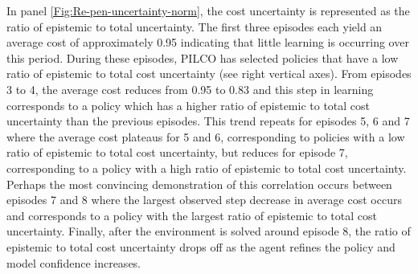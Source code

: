 In panel \ref{Fig:Re-pen-uncertainty-norm}, the cost uncertainty is represented as the ratio of epistemic to total uncertainty. The first three episodes each yield an average cost of approximately 0.95 indicating that little learning is occurring over this period. During these episodes, PILCO has selected policies that have a low ratio of epistemic to total cost uncertainty (see right vertical axes). From episodes 3 to 4, the average cost reduces from 0.95 to 0.83 and this step in learning corresponds to a policy which has a higher ratio of epistemic to total cost uncertainty than the previous episodes. This trend repeats for episodes 5, 6 and 7 where the average cost plateaus for 5 and 6, corresponding to policies with a low ratio of epistemic to total cost uncertainty, but reduces for episode 7, corresponding to a policy with a high ratio of epistemic to total cost uncertainty. Perhaps the most convincing demonstration of this correlation occurs between episodes 7 and 8 where the largest observed step decrease in average cost occurs and corresponds to a policy with the largest ratio of epistemic to total cost uncertainty. Finally, after the environment is solved around episode 8, the ratio of epistemic to total cost uncertainty drops off as the agent refines the policy and model confidence increases. 


